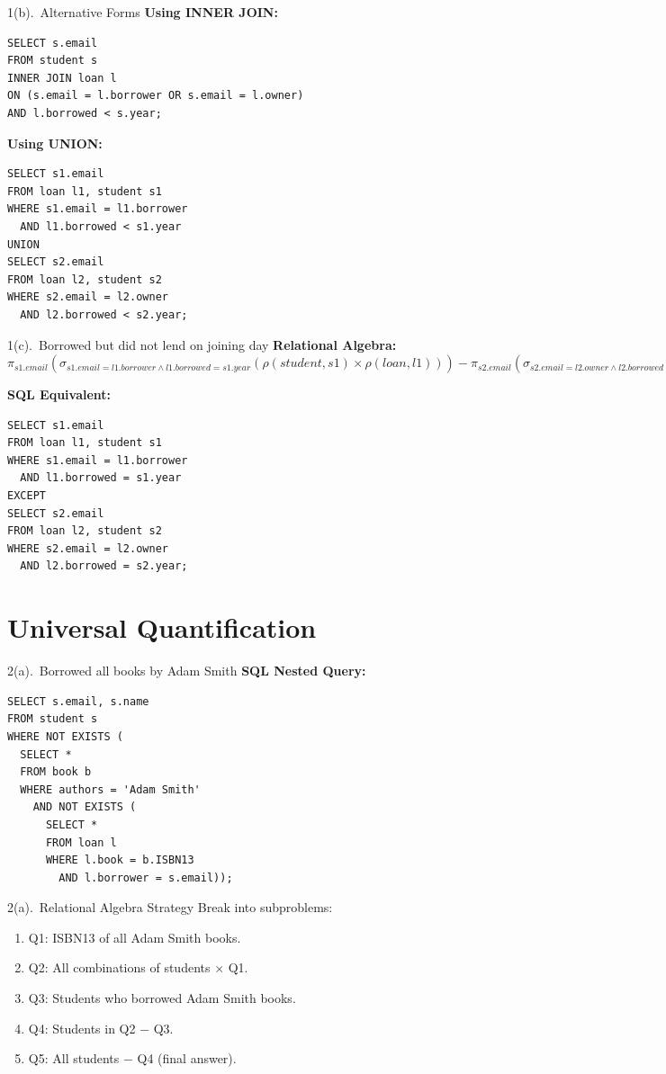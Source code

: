 \documentclass{beamer}
\begin{document}
\begin{frame}[fragile]{1(b).\ Alternative Forms}
\textbf{Using INNER JOIN:}
\begin{lstlisting}
SELECT s.email
FROM student s
INNER JOIN loan l
ON (s.email = l.borrower OR s.email = l.owner)
AND l.borrowed < s.year;
\end{lstlisting}

\textbf{Using UNION:}
\begin{lstlisting}
SELECT s1.email
FROM loan l1, student s1
WHERE s1.email = l1.borrower
  AND l1.borrowed < s1.year
UNION
SELECT s2.email
FROM loan l2, student s2
WHERE s2.email = l2.owner
  AND l2.borrowed < s2.year;
\end{lstlisting}
\end{frame}

\begin{frame}[fragile]{1(c).\ Borrowed but did not lend on joining day}
\textbf{Relational Algebra:}\\
$
\pi_{s1.email}(\sigma_{s1.email=l1.borrower \wedge l1.borrowed=s1.year}
(\rho(student,s1)\times\rho(loan,l1)))
-
\pi_{s2.email}(\sigma_{s2.email=l2.owner \wedge l2.borrowed=s2.year}
(\rho(student,s2)\times\rho(loan,l2)))
$

\textbf{SQL Equivalent:}
\begin{lstlisting}
SELECT s1.email
FROM loan l1, student s1
WHERE s1.email = l1.borrower
  AND l1.borrowed = s1.year
EXCEPT
SELECT s2.email
FROM loan l2, student s2
WHERE s2.email = l2.owner
  AND l2.borrowed = s2.year;
\end{lstlisting}
\end{frame}

\section{Universal Quantification}
\begin{frame}[fragile]{2(a).\ Borrowed all books by Adam Smith}
\textbf{SQL Nested Query:}
\begin{lstlisting}
SELECT s.email, s.name
FROM student s
WHERE NOT EXISTS (
  SELECT *
  FROM book b
  WHERE authors = 'Adam Smith'
    AND NOT EXISTS (
      SELECT *
      FROM loan l
      WHERE l.book = b.ISBN13
        AND l.borrower = s.email));
\end{lstlisting}
\end{frame}

\begin{frame}{2(a).\ Relational Algebra Strategy}
\small
Break into subproblems:
\begin{enumerate}
  \item Q1: ISBN13 of all Adam Smith books.
  \item Q2: All combinations of students × Q1.
  \item Q3: Students who borrowed Adam Smith books.
  \item Q4: Students in Q2 − Q3.
  \item Q5: All students − Q4 (final answer).
\end{enumerate}
\end{frame}
\end{document}
